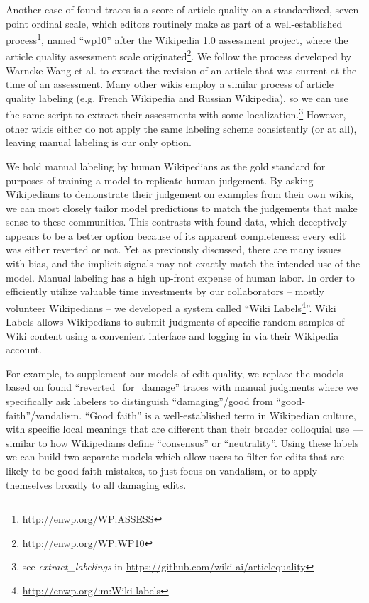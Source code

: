 Another case of found traces is a score of article quality on a standardized, seven-point ordinal scale, which editors routinely make as part of a well-established process\footnote{\url{http://enwp.org/WP:ASSESS}}, named ``wp10'' after the Wikipedia 1.0 assessment project, where the article quality assessment scale originated\footnote{\url{http://enwp.org/WP:WP10}}.  We follow the process developed by Warncke-Wang et al.\cite{wang2017english} to extract the revision of an article that was current at the time of an assessment.  Many other wikis employ a similar process of article quality labeling (e.g. French Wikipedia and Russian Wikipedia), so we can use the same script to extract their assessments with some localization.\footnote{see \emph{extract\_labelings} in \url{https://github.com/wiki-ai/articlequality}}  However, other wikis either do not apply the same labeling scheme consistently (or at all), leaving manual labeling is our only option.

%
We hold manual labeling by human Wikipedians as the gold standard for purposes of training a model to replicate human judgement.  By asking Wikipedians to demonstrate their judgement on examples from their own wikis, we can most closely tailor model predictions to match the judgements that make sense to these communities.  This contrasts with found data, which deceptively appears to be a better option because of its apparent completeness: every edit was either reverted or not. Yet as previously discussed, there are many issues with bias, and the implicit signals may not exactly match the intended use of the model.  Manual labeling has a high up-front expense of human labor.  In order to efficiently utilize valuable time investments by our collaborators -- mostly volunteer Wikipedians -- we developed a system called ``Wiki Labels\footnote{\url{http://enwp.org/:m:Wiki labels}}''.  Wiki Labels allows Wikipedians to submit judgments of specific random samples of Wiki content using a convenient interface and logging in via their Wikipedia account.

For example, to supplement our models of edit quality, we replace the models based on found ``reverted\_for\_damage'' traces with manual judgments where we specifically ask labelers to distinguish ``damaging''/good from ``good-faith''/vandalism. ``Good faith'' is a well-established term in Wikipedian culture, with specific local meanings that are different than their broader colloquial use --- similar to how Wikipedians define ``consensus'' or ``neutrality''.  Using these labels we can build two separate models which allow users to filter for edits that are likely to be good-faith mistakes\cite{halfaker2017automated}, to just focus on vandalism, or to apply themselves broadly to all damaging edits.

